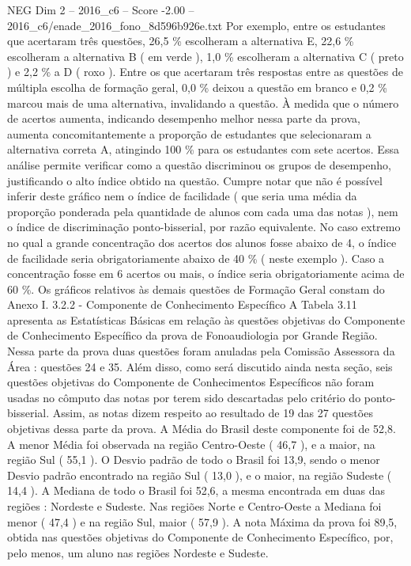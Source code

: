 \begin{textsample}{NEG Dim 2 – 2016\_c6 – Score -2.00 – 2016\_c6/enade\_2016\_fono\_8d596b926e.txt}
Por exemplo, entre os estudantes que acertaram três questões, 26,5 \% escolheram a alternativa E, 22,6 \% escolheram a alternativa B ( em verde ), 1,0 \% escolheram a alternativa C ( preto ) e 2,2 \% a D ( roxo ).
Entre os que acertaram três respostas entre as questões de múltipla escolha de formação geral, 0,0 \% deixou a questão em branco e 0,2 \% marcou mais de uma alternativa, invalidando a questão.
À medida que o número de acertos aumenta, indicando desempenho melhor nessa parte da prova, aumenta concomitantemente a proporção de estudantes que selecionaram a alternativa correta A, atingindo 100 \% para os estudantes com sete acertos.
Essa análise permite verificar como a questão discriminou os grupos de desempenho, justificando o alto índice obtido na questão.
Cumpre notar que não é possível inferir deste gráfico nem o índice de facilidade ( que seria uma média da proporção ponderada pela quantidade de alunos com cada uma das notas ), nem o índice de discriminação ponto-bisserial, por razão equivalente.
No caso extremo no qual a grande concentração dos acertos dos alunos fosse abaixo de 4, o índice de facilidade seria obrigatoriamente abaixo de 40 \% ( neste exemplo ).
Caso a concentração fosse em 6 acertos ou mais, o índice seria obrigatoriamente acima de 60 \%.
Os gráficos relativos às demais questões de Formação Geral constam do Anexo I. 3.2.2 - Componente de Conhecimento Específico A Tabela 3.11 apresenta as Estatísticas Básicas em relação às questões objetivas do Componente de Conhecimento Específico da prova de Fonoaudiologia por Grande Região.
Nessa parte da prova duas questões foram anuladas pela Comissão Assessora da Área : questões 24 e 35.
Além disso, como será discutido ainda nesta seção, seis questões objetivas do Componente de Conhecimentos Específicos não foram usadas no cômputo das notas por terem sido descartadas pelo critério do ponto-bisserial.
Assim, as notas dizem respeito ao resultado de 19 das 27 questões objetivas dessa parte da prova.
A Média do Brasil deste componente foi de 52,8.
A menor Média foi observada na região Centro-Oeste ( 46,7 ), e a maior, na região Sul ( 55,1 ).
O Desvio padrão de todo o Brasil foi 13,9, sendo o menor Desvio padrão encontrado na região Sul ( 13,0 ), e o maior, na região Sudeste ( 14,4 ).
A Mediana de todo o Brasil foi 52,6, a mesma encontrada em duas das regiões : Nordeste e Sudeste.
Nas regiões Norte e Centro-Oeste a Mediana foi menor ( 47,4 ) e na região Sul, maior ( 57,9 ).
A nota Máxima da prova foi 89,5, obtida nas questões objetivas do Componente de Conhecimento Específico, por, pelo menos, um aluno nas regiões Nordeste e Sudeste.

\end{textsample}
